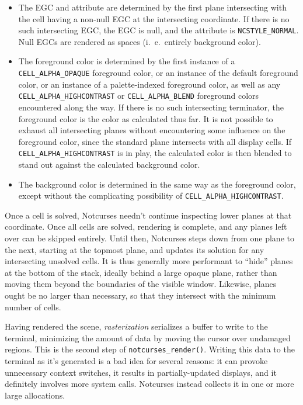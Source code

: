 \documentclass[letterpaper,10pt]{article}
\newenvironment{denseitemize}{
  \begin{itemize}
      \setlength{\itemsep}{0pt}
}{
  \end{itemize}
}
\begin{document}
\begin{denseitemize}
\item{The EGC and attribute are determined by the first plane intersecting with
      the cell having a non-null EGC at the intersecting coordinate. If there is
    no such intersecting EGC, the EGC is null, and the attribute is
    \texttt{NCSTYLE\_NORMAL}.} Null EGCs are rendered as spaces (i.\ e.\ entirely
    background color).
\item{The foreground color is determined by the first instance of a
    \texttt{CELL\_ALPHA\_OPAQUE} foreground color, or an instance of the
    default foreground color, or an instance of a palette-indexed foreground
    color, as well as any \texttt{CELL\_ALPHA\_HIGHCONTRAST} or \texttt{CELL\_ALPHA\_BLEND}
    foreground colors encountered along the way. If there is no such intersecting
    terminator, the foreground color is the color as calculated thus far. It is
    not possible to exhaust all intersecting planes without encountering some
    influence on the foreground color, since the standard plane intersects with
    all display cells. If \texttt{CELL\_ALPHA\_HIGHCONTRAST} is in play, the
    calculated color is then blended to stand out against the calculated background
    color.}
\item{The background color is determined in the same way as the foreground color,
    except without the complicating possibility of \texttt{CELL\_ALPHA\_HIGHCONTRAST}.}
\end{denseitemize}

Once a cell is solved, Notcurses needn't continue inspecting lower planes at
that coordinate. Once all cells are solved, rendering is complete, and any
planes left over can be skipped entirely. Until then, Notcurses steps down from
one plane to the next, starting at the topmost plane, and updates its solution
for any intersecting unsolved cells. It is thus generally more performant to
``hide'' planes at the bottom of the stack, ideally behind a large opaque plane,
rather than moving them beyond the boundaries of the visible window. Likewise,
planes ought be no larger than necessary, so that they intersect with the
minimum number of cells.

Having rendered the scene, \textit{rasterization} serializes a buffer to write
to the terminal, minimizing the amount of data by moving the cursor over undamaged
regions. This is the second step of \texttt{notcurses\_render()}. Writing this
data to the terminal as it's generated is a bad idea for several reasons: it can
provoke unnecessary context switches, it results in partially-updated displays,
and it definitely involves more system calls. Notcurses instead collects it in
one or more large allocations.
\end{document}
